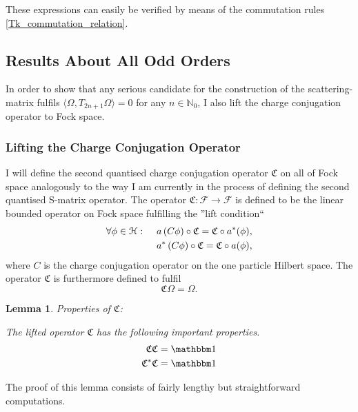 \documentclass[b5paper,draft,openbib,12pt]{memoir}
\newtheorem{lemma}{Lemma}
\newcommand{\id}{{\mathbbm 1}}
\begin{document}
These expressions can easily be verified by means of the commutation rules \eqref{Tk_commutation_relation}.


\subsection{Results About All Odd Orders}\label{sec: odd orders}
In order to show that any serious candidate for the construction of the scattering-matrix fulfils \(\langle \Omega, T_{2n+1}\Omega \rangle =0\) for any \(n\in\mathbb{N}_0\), I also lift the charge conjugation operator to Fock space.
\subsubsection{ Lifting the Charge Conjugation Operator}


I will define the second quantised charge conjugation operator \(\mathfrak{C}\) on all of Fock space analogously to the way I am currently in the process of defining the second quantised S-matrix operator.
The operator \(\mathfrak{C}: \mathcal{F}\rightarrow \mathcal{F}\) is defined to be the linear bounded operator on Fock space fulfilling the ''lift condition``
\begin{equation}
\begin{aligned}
\forall \phi\in \mathcal{H}: \hspace{0.5cm} &a\left( C \phi \right)  \circ \mathfrak{C}=\mathfrak{C} \circ a^*(\phi),\\
\hspace{0.5cm} &a^*\left( C \phi \right)  \circ \mathfrak{C}=\mathfrak{C} \circ a(\phi),
\end{aligned}
\end{equation}
where \(C\) is the charge conjugation operator on the one particle Hilbert space. The operator \(\mathfrak{C}\) is furthermore defined to fulfil
\begin{equation}
\mathfrak{C}\Omega=\Omega.
\end{equation}

\begin{lemma}\label{basic_properties}
{\large Properties of} \(\mathfrak{C}\):

The lifted operator \(\mathfrak{C}\) has the following important properties.
\begin{align}
\mathfrak{C} \mathfrak{C} = \id \label{self_invers}\\
\mathfrak{C}^* \mathfrak{C} = \id \label{unitarity}
\end{align}
\end{lemma}
The proof of this lemma consists of fairly lengthy but straightforward computations.
\end{document}
